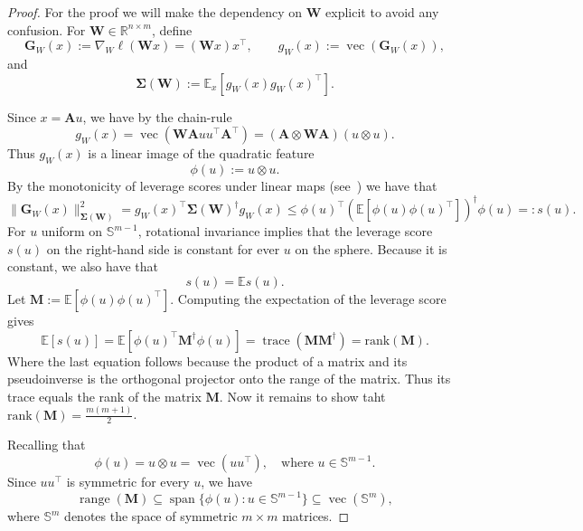\documentclass[11pt]{article}
\newcommand{\mat}[1]{\bm{#1}}
\newcommand{\E}{\mathbb{E}}
\begin{document}
\begin{proof}
   For the proof we will make the dependency on $\mat{W}$ explicit to avoid any confusion. For
$\mat{W} \in \mathbb{R}^{n\times m}$, define
\[
    \mat{G}_W(x) := \nabla_W \ell(\mat{W}x) = (\mat{W}x)x^\top,
    \qquad
    g_W(x) := \operatorname{vec}(\mat{G}_W(x)),
\]
and
\[
    \mat{\Sigma}(\mat{W}) := \mathbb{E}_x[g_W(x)g_W(x)^\top].
\]

Since $x=\mat{A}u$, we have by the chain-rule
\[
    g_W(x)
    =
    \operatorname{vec}\!\left(\mat{W}\mat{A}uu^\top \mat{A}^\top\right)
    =
    (\mat{A} \otimes \mat{W}\mat{A})(u\otimes u).
\]
Thus $g_W(x)$ is a linear image of the quadratic feature
\[
    \phi(u) := u\otimes u.
\]
By the monotonicity of leverage scores under linear maps (see~) we have that
\begin{equation} \label{eq:eafezefzevf}
   \| \mat{G}_W(x)\|_{\mat{\Sigma}(\mat{W})}^2 = g_W(x)^\top \mat{\Sigma}(\mat{W})^\dagger g_W(x)
    \leq
    \phi(u)^\top
    \left(
        \mathbb{E}[\phi(u)\phi(u)^\top]
    \right)^\dagger \phi(u) =:s(u)
    .
\end{equation}
For $u$ uniform on $\mathbb{S}^{m-1}$, rotational invariance implies that
the leverage score $s(u)$ on the right-hand side is constant for ever $u$ on the sphere.
Because it is constant, we also have that 
\begin{equation} \label{eq:eafezefzevf2}
    s(u) = \E{s(u)}.
\end{equation}
 Let $\mat{M} := \mathbb{E}[\phi(u)\phi(u)^\top]$. Computing the expectation of the leverage score gives
\begin{equation} \label{eq:eafezefzevf3}
    \mathbb{E}[s(u)]
    =
    \mathbb{E}[\phi(u)^\top
  \mat{M}^\dagger
    \phi(u)]
    =
    \operatorname{trace}
    \left(
        \mat{M} \mat{M}^\dagger
    \right) = \mathrm{rank}(\mat{M}).
\end{equation}
Where the last equation follows because the product of a matrix and its pseudoinverse is the orthogonal projector onto the range of the matrix. Thus its trace equals the rank of the matrix $\mat{M} .$
Now it remains to show taht $\mathrm{rank}(\mat{M}) = \frac{m(m+1)}{2}$.


Recalling that
\[
\phi(u)=u\otimes u=\operatorname{vec}(uu^\top), \quad \mbox{where } u\in\mathbb{S}^{m-1}.
\]
Since $uu^\top$ is symmetric for every $u$, we have
\[
\operatorname{range}(\mat{M})
\subseteq
\operatorname{span}\{\phi(u):u\in\mathbb{S}^{m-1}\}
\subseteq
\operatorname{vec}(\mathbb{S}^m),
\]
where $\mathbb{S}^m$ denotes the space of symmetric $m\times m$ matrices.


\end{proof}
\end{document}
